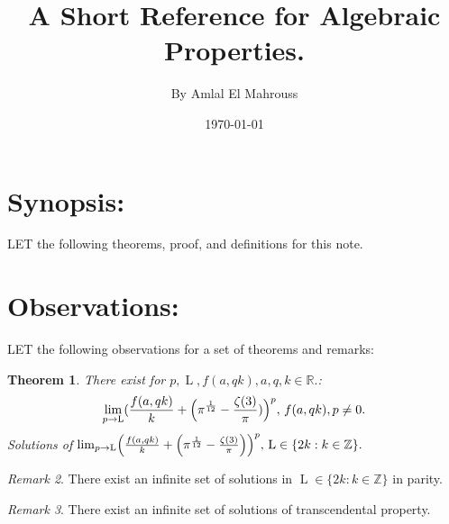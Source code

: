 \documentclass[10pt]{article}
\title{%
	\vspace{-1.5em}%
	\large\textbf{A Short Reference for Algebraic Properties.}%
}
\author{By Amlal El Mahrouss}
\date{\today}
\theoremstyle{plain}
\newtheorem{theorem}{Theorem}[section]
\theoremstyle{definition}
\theoremstyle{remark}
\newtheorem{remark}[theorem]{Remark}
\begin{document}

\maketitle
\tableofcontents
\newpage

\section{Synopsis:}

\lettrine[lines=1, lhang=0.1, loversize=0.2]{L}ET the following theorems, proof, and definitions for this note.

\section{Observations:}

\lettrine[lines=1, lhang=0.1, loversize=0.2]{L}ET the following observations for a set of theorems and remarks:

\begin{theorem}
	There exist for $p, \operatorname{L}, f(a, qk), a, q, k \in \mathbb{R}.$:
	\begin{equation}
		\lim_{p \to \operatorname{L}} (\frac{f(a, qk)}{k} + \Bigl(\pi^{\frac{1}{12}} - \frac{\zeta(3)}{\pi})\Bigr)^p, \, f(a, qk), p \neq 0.
	\end{equation}
	Solutions of $\lim_{p \to \operatorname{L}} \Bigl(\frac{f(a, qk)}{k} + \Bigl(\pi^{\frac{1}{12}} - \frac{\zeta(3)}{\pi}\Bigr)\Bigr)^p, \, \operatorname{L} \in \{2k : k \in \mathbb{Z}\}.$
\end{theorem}
\begin{remark}
	There exist an infinite set of solutions in $\operatorname{L} \in \{2k : k \in \mathbb{Z}\}$ in parity.
\end{remark}
\begin{remark}
There exist an infinite set of solutions of transcendental property.
\end{remark}
\end{document}
